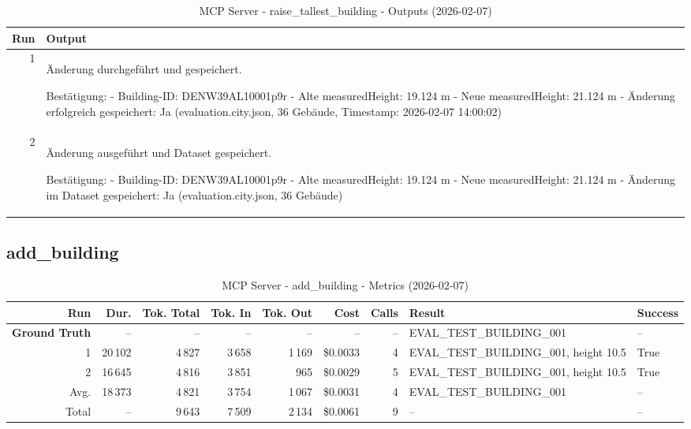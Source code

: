\documentclass[a4paper,11pt]{article}
\begin{document}
\clearpage

\begin{table}[ht]
\centering
\scriptsize
\caption{MCP Server - raise\_tallest\_building - Outputs (2026-02-07)}
\label{tab:mcp\_raise\_tallest\_building\_outputs\_2026-02-07}
\begin{tabular}{r p{12cm}}
\hline
Run & Output \\
\hline
1 & Änderung durchgeführt und gespeichert.

Bestätigung:
- Building-ID: DENW39AL10001p9r
- Alte measuredHeight: 19.124 m
- Neue measuredHeight: 21.124 m
- Änderung erfolgreich gespeichert: Ja (evaluation.city.json, 36 Gebäude, Timestamp: 2026-02-07 14:00:02) \\
2 & Änderung ausgeführt und Dataset gespeichert.

Bestätigung:
- Building-ID: DENW39AL10001p9r
- Alte measuredHeight: 19.124 m
- Neue measuredHeight: 21.124 m
- Änderung im Dataset gespeichert: Ja (evaluation.city.json, 36 Gebäude) \\
\hline
\end{tabular}
\end{table}

\clearpage
\subsection{add\_building}

\begin{table}[ht]
\centering
\scriptsize
\caption{MCP Server - add\_building - Metrics (2026-02-07)}
\label{tab:mcp\_add\_building\_metrics\_2026-02-07}
\begin{tabular}{r r r r r r r p{3cm} l}
\hline
Run & Dur. & Tok. Total & Tok. In & Tok. Out & Cost & Calls & Result & Success \\
\hline
\textbf{Ground Truth} & -- & -- & -- & -- & -- & -- & EVAL\_TEST\_BUILDING\_001 & -- \\
\hline
1 & 20\,102 & 4\,827 & 3\,658 & 1\,169 & \$0.0033 & 4 & EVAL\_TEST\_BUILDING\_001, height 10.5 & True \\
2 & 16\,645 & 4\,816 & 3\,851 & 965 & \$0.0029 & 5 & EVAL\_TEST\_BUILDING\_001, height 10.5 & True \\
\hline
Avg. & 18\,373 & 4\,821 & 3\,754 & 1\,067 & \$0.0031 & 4 & EVAL\_TEST\_BUILDING\_001 & -- \\
Total & -- & 9\,643 & 7\,509 & 2\,134 & \$0.0061 & 9 & -- & -- \\
\hline
\end{tabular}
\end{table}
\end{document}
